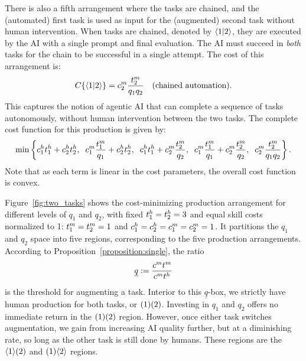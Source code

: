 \documentclass{article}
\theoremstyle{plain}
\theoremstyle{plain}
\begin{document}
There is also a fifth arrangement where the tasks are chained, and the (automated) first task is used as input for the (augmented) second task without human intervention.
When tasks are chained, denoted by $\langle 1|2 \rangle$, they are executed by the AI with a single prompt and final evaluation.
The AI must succeed in \emph{both} tasks for the chain to be successful in a single attempt.
The cost of this arrangement is:
\begin{align*}
C\{ \langle 1|2 \rangle \} &= c^{m}_{2} \frac{t^{m}_{2}}{q_1 q_2} & \text{(chained automation)}.
\end{align*}
This captures the notion of agentic AI that can complete a sequence of tasks autonomously, without human intervention between the two tasks.
The complete cost function for this production is given by:
\begin{align}
  \min \left\{ 
  c^{h}_{1} t^{h}_{1} + c^{h}_{2} t^{h}_{2}, \;\; 
  c^{m}_{1} \frac{t^{m}_{1}}{q_1} + c^{h}_{2} t^{h}_{2}, \;\; 
  c^{h}_{1} t^{h}_{1} + c^{m}_{2} \frac{t^{m}_{2}}{q_2}, \;\; 
  c^{m}_{1} \frac{t^{m}_{1}}{q_1} + c^{m}_{2} \frac{t^{m}_{2}}{q_2}, \;\; 
  c^{m}_{2} \frac{t^{m}_{2}}{q_1 q_2}
  \right\}.
\end{align}
Note that as each term is linear in the cost parameters, the overall cost function is convex.

Figure~\ref{fig:two_tasks} shows the cost-minimizing production arrangement for different levels of \(q_1\) and \(q_2\), with fixed \(t^{h}_{1} = t^{h}_{2} = 3\) and equal skill costs normalized to 1: \(t^{m}_{1} = t^{m}_{2} = 1\) and \(c^{h}_{1} = c^{h}_{2} = c^{m}_{1} = c^{m}_{2} = 1\).
It partitions the \(q_1\) and \(q_2\) space into five regions, corresponding to the five production arrangements.
According to Proposition~\ref{proposition:single}, the ratio 
\[
\underline{q} := \frac{c^{m}_{} t^{m}_{}}{c^{m}_{} t^{h}_{}}
\]
is the threshold for augmenting a task.
Interior to this \(\underline{q}\)-box, we strictly have human production for both tasks, or \(( 1 )( 2 )\).
Investing in \(q_1\) and \(q_2\) offers no immediate return in the \(( 1 )( 2 )\) region.
However, once either task switches augmentation, we gain from increasing AI quality further, but at a diminishing rate, so long as the other task is still done by humans.
These regions are the \(\langle 1 \rangle( 2 )\) and \(( 1 )\langle 2 \rangle\) regions.
\end{document}
